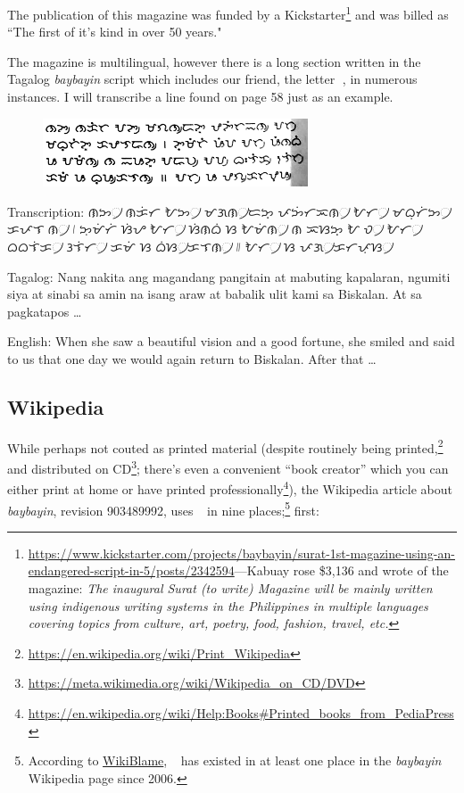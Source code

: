 \documentclass[a4paper,pagesize,openany,14pt,parskip=never]{scrbook}
\newcommand{\≈}{$\approx$}
\newcommand{\ra}{{\baybayin ᜍ}}
\begin{document}
The publication of this magazine was funded by a Kickstarter\footnote{\url{https://www.kickstarter.com/projects/baybayin/surat-1st-magazine-using-an-endangered-script-in-5/posts/2342594}---Kabuay rose \$3,136 and wrote of the magazine: {\em The inaugural Surat (to write) Magazine will be mainly written using indigenous writing systems in the Philippines in multiple languages covering topics from culture, art, poetry, food, fashion, travel, etc.}} and was billed as ``The first of it's kind in over 50 years."

The magazine is multilingual, however there is a long section written in the Tagalog {\em baybayin} script which includes our friend, the letter {\baybayin ᜍ}, in numerous instances. I will transcribe a line found on page 58 just as an example.

\begin{figure}[H]
\includegraphics[width=0.7\textwidth]{SURAT_Ef}
\end{figure}

Transcription: {\baybayin ᜈᜅ᜴ ᜈᜃᜒᜆ ᜀᜅ᜴ ᜋᜄᜈ᜴ᜇᜅ᜔ ᜉᜅᜒᜆᜁᜈ᜴ ᜀᜆ᜴ ᜋᜊᜓᜆᜒᜅ᜴ ᜃᜉᜎᜍᜈ᜴ ᜵ ᜅᜓᜋᜒᜆᜒ ᜐᜒᜌ ᜀᜆ᜴ ᜐᜒᜈᜊᜒ ᜐ ᜀᜋᜒᜈ᜴ ᜈ ᜁᜐᜅ᜔ ᜀᜍᜏ᜴ ᜀᜆ᜴ ᜊᜊᜎᜒᜃ᜴ ᜂᜎᜒᜆ᜴ ᜃᜋᜒ ᜐ ᜊᜒᜐ᜴ᜃᜎᜈ᜴ ᜶ ᜀᜆ᜴ ᜐ ᜉᜄ᜴ᜃᜆᜉᜓᜐ᜴}

Tagalog: Nang nakita ang magandang pangitain at mabuting kapalaran, ngumiti siya at sinabi sa amin na isang araw at babalik ulit kami sa Biskalan. At sa pagkatapos \ldots

English: When she saw a beautiful vision and a good fortune, she smiled and said to us that one day we would again return to Biskalan. After that \ldots

\subsection{Wikipedia}

While perhaps not couted as printed material (despite routinely being printed,\footnote{\url{https://en.wikipedia.org/wiki/Print\_Wikipedia}} and distributed on CD\footnote{\url{https://meta.wikimedia.org/wiki/Wikipedia\_on\_CD/DVD}}; there's even a convenient ``book creator'' which you can either print at home or have printed professionally\footnote{\url{https://en.wikipedia.org/wiki/Help:Books\#Printed\_books\_from\_PediaPress}}), the Wikipedia article about {\em baybayin}, revision 903489992, uses \ra\ in nine places;\footnote{According to \href{http://wikipedia.ramselehof.de/wikiblame.php}{WikiBlame}, \ra\ has existed in at least one place in the {\em baybayin} Wikipedia page since 2006.} first:
\end{document}
